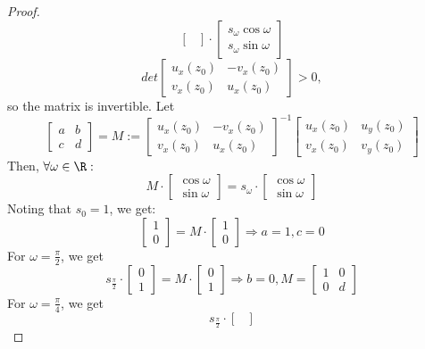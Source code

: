 \begin{proof}
$$\begin{bmatrix}
\end{bmatrix}
\cdot
\begin{bmatrix}
  s_\omega\cos \omega \\
  s_\omega\sin \omega
\end{bmatrix}
$$
$$
det
\begin{bmatrix}
  u_x(z_0) & -v_x(z_0) \\
  v_x(z_0) & u_x(z_0)
\end{bmatrix}
>0,
$$
so the matrix is invertible. Let
$$
\begin{bmatrix}
  a & b \\
  c & d
\end{bmatrix}
=M:=
\begin{bmatrix}
  u_x(z_0) & -v_x(z_0) \\
  v_x(z_0) & u_x(z_0)
\end{bmatrix}^{-1}
\begin{bmatrix}
  u_x(z_0) & u_y(z_0) \\
  v_x(z_0) & v_y(z_0)
\end{bmatrix}
$$
Then, $\forall \omega \in \R:$
$$
M\cdot
\begin{bmatrix}
  \cos \omega \\
  \sin \omega
\end{bmatrix}
=s_\omega \cdot
\begin{bmatrix}
  \cos \omega \\
  \sin \omega
\end{bmatrix}
$$
Noting that $s_0=1$, we get:
$$
\begin{bmatrix}
  1 \\
  0
\end{bmatrix}
=M\cdot
\begin{bmatrix}
  1 \\
  0
\end{bmatrix}
\Rightarrow a=1, c=0
$$
For $\omega =\frac{\pi}{2}$, we get
$$
s_{\frac{\pi}{2}} \cdot
\begin{bmatrix}
  0 \\
  1
\end{bmatrix}
=M \cdot
\begin{bmatrix}
  0 \\
  1
\end{bmatrix}
\Rightarrow b=0,
M=
\begin{bmatrix}
  1 & 0 \\
  0 & d
\end{bmatrix}
$$
For $\omega = \frac{\pi }{4}$, we get
$$
s_{\frac{\pi}{2}} \cdot
\begin{bmatrix}

\end{bmatrix}$$
\end{proof}
